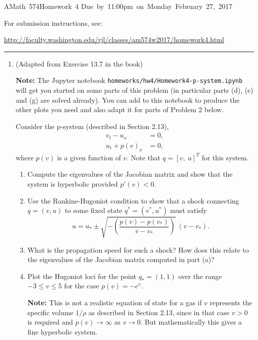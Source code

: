\documentclass[11pt]{article}
\begin{document}
\hfill\vbox{\hbox{AMath 574}\hbox{Homework 4}
\hbox{Due by 11:00pm on Monday February 27, 2017}}

For submission instructions, see:

\url{http://faculty.washington.edu/rjl/classes/am574w2017/homework4.html}




\vskip 1cm
\hrule
\begin{enumerate} 
\item
(Adapted from Exercise 13.7 in the book)

{\bf Note:} The Jupyter notebook {\tt homeworks/hw4/Homework4-p-system.ipynb} 
will get you started on some parts of this problem (in particular parts (d),
(e) and (g) are solved already).  You can add
to this notebook to produce the other plots you need and also adapt it for
parts of Problem 2 below.

Consider the p-system (described in Section 2.13),
\begin{equation*}
\begin{split} 
v_t - u_x &= 0,\\
u_t + p(v)_x &= 0,
\end{split} 
\end{equation*}
where $p(v)$ is a given function of $v$.
Note that $q = [v,~u]^T$ for this system.
\begin{enumerate} 
\item Compute the eigenvalues of the Jacobian matrix and show that the
system is hyperbolic provided $p'(v)<0$.
\item Use the Rankine-Hugoniot condition to show that a shock connecting
$q=(v,u)$ to some fixed state $q^*=(v^*,u^*)$ must satisfy
\begin{equation} 
u = u_* \pm \sqrt{-\left( \frac{p(v)-p(v_*)}{v-v_*} \right)} ~(v-v_*).
\end{equation}
\item What is the propagation speed for such a shock?  How does this relate
to the eigenvalues of the Jacobian matrix computed in part (a)?
\item Plot the Hugoniot loci for the point $q_* = (1,1)$ over the range
$-3\leq v \leq 5$ for the case $p(v) = -e^v$.

{\bf Note:} This is not a realistic equation of state for a gas if $v$
represents the specific volume $1/\rho$ as described in Section 2.13, since
in that case $v>0$ is required and $p(v) \rightarrow \infty$ as
$v\rightarrow 0$.  But mathematically this gives a fine hyperbolic system.


\end{enumerate}
\end{enumerate}
\end{document}
